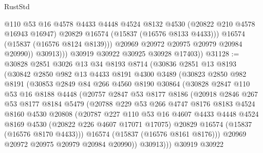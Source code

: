 \begin{lexlean}{RustStd}
\begin{coremodule}
                      @110
                      @53
                      @16
                      @4578
                      @4433
                      @4448
                      @4524
                      @8132
                      @4530
                      (@20822 @210 @4578 @16943 @16947)
                      @20829
                      @16574
                      (@15837 (@16576 @8133 @4433)))
                    @16574
                    (@15837 (@16576 @8124 @8139)))
                  @20969
                  @20972
                  @20975
                  @20979
                  @20984
                  @20990))
              @30913)))
        @30919
        @30922
        @30925
        @30928
        @17403))
@31128 := @30828
    @2851
    @3026
    @13
    @34
    @8193
    @8714
    (@30836
      @2851
      @13
      @8193
      (@30842
        @2850
        @982
        @13
        @4433
        @8191
        @4300
        @3489
        (@30823
          @2850
          @982
          @8191
          (@30853
            @2849
            @84
            @266
            @4560
            @8190
            @30864
            (@30828
              @2847
              @110
              @53
              @16
              @8188
              @4448
              (@20757
                @2847
                @53
                @8177
                @8186
                (@20918
                  @2846
                  @267
                  @53
                  @8177
                  @8184
                  @5479
                  (@20788
                    @229
                    @53
                    @266
                    @4747
                    @8176
                    @8183
                    @4524
                    @8160
                    @4530
                    @20808
                    (@20787
                      @227
                      @110
                      @53
                      @16
                      @4607
                      @4433
                      @4448
                      @4524
                      @8169
                      @4530
                      (@20822 @226 @4607 @17071 @17075)
                      @20829
                      @16574
                      (@15837 (@16576 @8170 @4433)))
                    @16574
                    (@15837 (@16576 @8161 @8176)))
                  @20969
                  @20972
                  @20975
                  @20979
                  @20984
                  @20990))
              @30913)))
        @30919
        @30922

\end{coremodule}
\end{lexlean}
